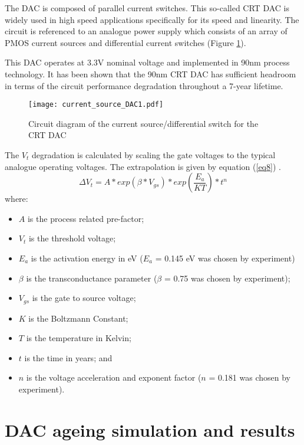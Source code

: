 \documentclass[11pt,a4paper]{article}
\begin{document}
The DAC  is composed of parallel current switches. This so-called CRT DAC is widely used in  high speed applications specifically for its speed and linearity. The circuit is referenced to an analogue power supply which consists of an array of PMOS current sources and differential current switches (Figure \ref{figure8}).

This DAC operates at 3.3V nominal voltage and implemented in 90nm process technology. It has been shown that the 90nm CRT DAC has sufficient headroom in terms of the circuit performance degradation throughout a 7-year lifetime.

\begin{figure}[t]
\centering
\texttt{[image: current\_source\_DAC1.pdf]}
\caption{Circuit diagram of the current source/differential switch for the CRT DAC}
\label{figure8}
\end{figure}
The $V_{t}$ degradation 
is calculated by scaling the gate voltages to the typical analogue operating voltages. The extrapolation is given by equation (\ref{eq8}) \cite{Jha}.
\begin{equation} 
\Delta{V_t} = A*exp(\beta*V_{gs})*exp\left (\frac{E_a}{KT}\right )*t^n
\label{eq8}	
\end{equation}
where:
\begin{itemize}\item $A$ is the process related pre-factor;
\item $V_t$ is the threshold voltage;
\item $E_a$ is the activation energy in eV ($E_a$ = 0.145 eV was chosen by experiment)
\item $\beta$ is the transconductance parameter ($\beta$ = 0.75 was chosen by experiment);
\item $V_{gs}$ is the gate to source voltage;
\item $K$ is the Boltzmann Constant;
\item $T$ is the temperature in Kelvin;
\item $t$ is the time in years; and
\item $n$ is the voltage acceleration and exponent factor ($n$ = 0.181 was chosen by experiment).
\end{itemize}



\section{DAC ageing simulation and results}
\end{document}
